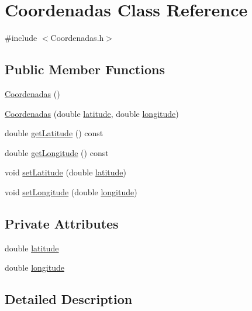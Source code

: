 \hypertarget{class_coordenadas}{\section{Coordenadas Class Reference}
\label{class_coordenadas}
}


{\ttfamily \#include $<$Coordenadas.\+h$>$}

\subsection*{Public Member Functions}
\begin{DoxyCompactItemize}
\item 
\hyperlink{class_coordenadas_a1c58a9c0153e6955da84b0861a925c68}{Coordenadas} ()
\item 
\hyperlink{class_coordenadas_a48d1210d6636eadb64690a2a75686658}{Coordenadas} (double \hyperlink{class_coordenadas_ad7aa0271fc0ca8c8da179f9cfe859bf0}{latitude}, double \hyperlink{class_coordenadas_a328c0d572b3a7d47bfbd866f5d6d6489}{longitude})
\item 
double \hyperlink{class_coordenadas_a1eac916230125776b081b09bf5121c8e}{get\+Latitude} () const 
\item 
double \hyperlink{class_coordenadas_ae2f616716136f0651d389e4824092c55}{get\+Longitude} () const 
\item 
void \hyperlink{class_coordenadas_a035cce119d74a61cb24676ef76f0f518}{set\+Latitude} (double \hyperlink{class_coordenadas_ad7aa0271fc0ca8c8da179f9cfe859bf0}{latitude})
\item 
void \hyperlink{class_coordenadas_af03ec9230d72b041265a9cbcf17a0369}{set\+Longitude} (double \hyperlink{class_coordenadas_a328c0d572b3a7d47bfbd866f5d6d6489}{longitude})
\end{DoxyCompactItemize}
\subsection*{Private Attributes}
\begin{DoxyCompactItemize}
\item 
double \hyperlink{class_coordenadas_ad7aa0271fc0ca8c8da179f9cfe859bf0}{latitude}
\item 
double \hyperlink{class_coordenadas_a328c0d572b3a7d47bfbd866f5d6d6489}{longitude}
\end{DoxyCompactItemize}


\subsection{Detailed Description}


